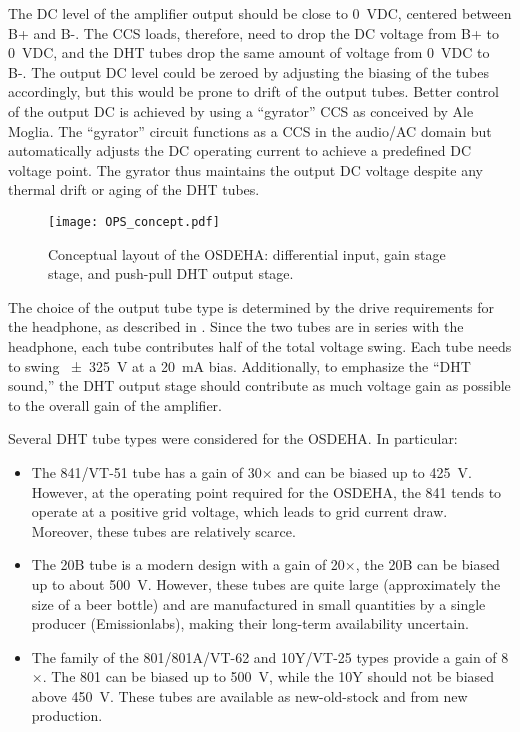 The DC level of the amplifier output should be close to \SI{0}{VDC}, centered between B+ and B-. The CCS loads, therefore, need to drop the DC voltage from B+ to \SI{0}{VDC}, and the DHT tubes drop the same amount of voltage from \SI{0}{VDC} to B-. The output DC level could be zeroed by adjusting the biasing of the tubes accordingly, but this would be prone to drift of the output tubes. Better control of the output DC is achieved by using a ``gyrator'' CCS as conceived by Ale Moglia\cite{mogliaa_gyrator}. The ``gyrator'' circuit functions as a CCS in the audio/AC domain but automatically adjusts the DC operating current to achieve a predefined DC voltage point. The gyrator thus maintains the output DC voltage despite any thermal drift or aging of the DHT tubes.

\begin{figure}
\begin{center}
\texttt{[image: OPS\_concept.pdf]}
\caption{Conceptual layout of the OSDEHA: differential input, gain stage stage, and push-pull DHT output stage.}
\end{center}
\end{figure}

The choice of the output tube type is determined by the drive requirements for the headphone, as described in . Since the two tubes are in series with the headphone, each tube contributes half of the total voltage swing. Each tube needs to swing \SI{\pm325}{V} at a \SI{20}{mA} bias. Additionally, to emphasize the ``DHT sound,'' the DHT output stage should contribute as much voltage gain as possible to the overall gain of the amplifier.

Several DHT tube types were considered for the OSDEHA\cite{osdeha_p9,osdeha_whichDHT}. In particular:

\begin{itemize}
\item The 841/VT-51 tube has a gain of 30$\times$ and can be biased up to \SI{425}{V}. However, at the operating point required for the OSDEHA, the 841 tends to operate at a positive grid voltage, which leads to grid current draw. Moreover, these tubes are relatively scarce.
\item The 20B tube is a modern design with a gain of 20$\times$, the 20B can be biased up to about \SI{500}{V}. However, these tubes are quite large (approximately the size of a beer bottle) and are manufactured in small quantities by a single producer (Emissionlabs), making their long-term availability uncertain.
\item The family of the 801/801A/VT-62 and 10Y/VT-25 types\cite{aasyl_801types} provide a gain of 8$\times$. The 801 can be biased up to \SI{500}{V}, while the 10Y should not be biased above \SI{450}{V}. These tubes are available as new-old-stock and from new production.
\end{itemize}

